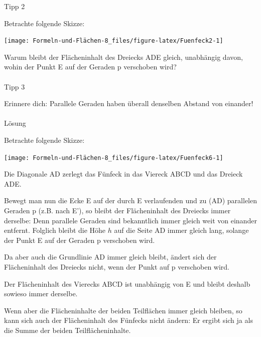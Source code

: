 \documentclass[
  ngerman,
]{book}
\begin{document}
Tipp 2

Betrachte folgende Skizze:

\begin{center}\texttt{[image: Formeln-und-Flächen-8\_files/figure-latex/Fuenfeck2-1]} \end{center}

Warum bleibt der Flächeninhalt des Dreiecks ADE gleich, unabhängig davon, wohin der Punkt E auf der Geraden p verschoben wird?

\hypertarget{section-21}{%
\paragraph*{}\label{section-21}}

Tipp 3

Erinnere dich: Parallele Geraden haben überall denselben Abstand von einander!

\hypertarget{section-22}{%
\paragraph*{}\label{section-22}}

Lösung

Betrachte folgende Skizze:

\begin{center}\texttt{[image: Formeln-und-Flächen-8\_files/figure-latex/Fuenfeck6-1]} \end{center}

Die Diagonale AD zerlegt das Fünfeck in das Viereck ABCD und das Dreieck ADE.

Bewegt man nun die Ecke E auf der durch E verlaufenden und zu (AD) parallelen Geraden p (z.B. nach E'), so bleibt der Flächeninhalt des Dreiecks immer derselbe: Denn parallele Geraden sind bekanntlich immer gleich weit von einander entfernt.
Folglich bleibt die Höhe \(h\) auf die Seite AD immer gleich lang, solange der Punkt E auf der Geraden p verschoben wird.

Da aber auch die Grundlinie AD immer gleich bleibt, ändert sich der Flächeninhalt des Dreiecks nicht, wenn der Punkt auf p verschoben wird.

Der Flächeninhalt des Vierecks ABCD ist unabhängig von E und bleibt deshalb sowieso immer derselbe.

Wenn aber die Flächeninhalte der beiden Teilflächen immer gleich bleiben, so kann sich auch der Flächeninhalt des Fünfecks nicht ändern: Er ergibt sich ja als die Summe der beiden Teilflächeninhalte.
\end{document}
